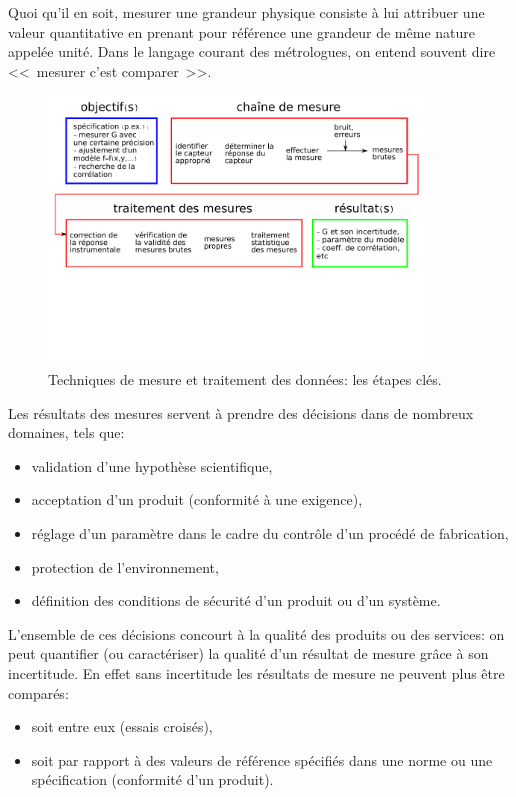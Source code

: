 Quoi qu'il en soit, mesurer une grandeur physique consiste à lui attribuer une valeur quantitative en prenant pour référence une grandeur de même nature appelée unité. Dans le langage courant des métrologues, on entend souvent dire \textless\textless\ mesurer c'est comparer\ \textgreater\textgreater.

\begin{figure}[ht]
    \centering
    \includegraphics[width=0.9\textwidth]{assets/figures/flowChartTechMes.pdf}
    \caption{Techniques de mesure et traitement des données: les étapes clés.}
    \label{fig:flowchartTechMes}
\end{figure}
Les résultats des mesures servent à prendre des décisions dans de nombreux domaines, tels que:

\begin{itemize}
    \item validation d'une hypothèse scientifique,
    \item acceptation d'un produit (conformité à une exigence),
    \item réglage d'un paramètre dans le cadre du contrôle d'un procédé de fabrication,
    \item protection de l'environnement,
    \item définition des conditions de sécurité d'un produit ou d'un système.
\end{itemize}

L'ensemble de ces décisions concourt à la qualité des produits ou des services: on peut quantifier (ou caractériser) la qualité d'un résultat de mesure grâce à son incertitude.
En effet sans incertitude les résultats de mesure ne peuvent plus être comparés:

\begin{itemize}
    \item soit entre eux (essais croisés),
    \item soit par rapport à des valeurs de référence spécifiés dans une norme ou une spécification (conformité d'un produit).
\end{itemize}

